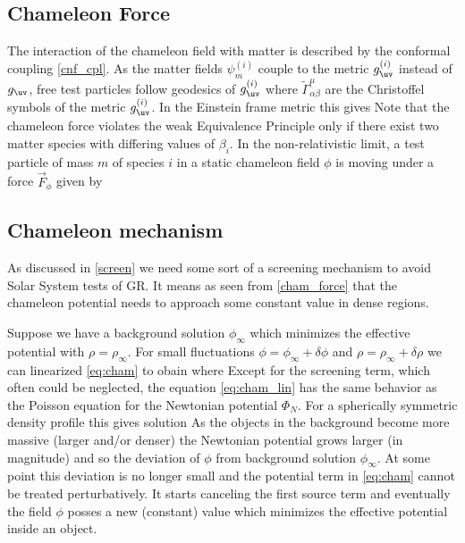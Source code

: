 \subsection{Chameleon Force}
The interaction of the chameleon field with matter is described by the conformal coupling \eqref{cnf_cpl}. As the matter fields $\psi_m^{(i)}$ couple to the metric $g_\uv^{(i)}$ instead of $g_\uv$, free test particles follow geodesics of $g_\uv^{(i)}$
where $\tilde{\Gamma}^\mu_{\alpha\beta}$ are the Christoffel symbols of the metric $g_\uv^{(i)}$. In the Einstein frame metric this gives \parencite{Waterhouse:2006wv}
Note that the chameleon force violates the weak Equivalence Principle only if there exist two matter species with differing values of $\beta_i$. In the non-relativistic limit, a test particle of mass $m$ of species $i$ in a static chameleon field $\phi$ is moving under a force $\vec{F}_\phi$ given by
\subsection{Chameleon mechanism}
As discussed in \autoref{screen} we need some sort of a screening mechanism to avoid Solar System tests of GR. It means as seen from \eqref{cham_force} that the chameleon potential needs to approach some constant value in dense regions.

Suppose we have a background solution $\phi_\infty$ which minimizes the effective potential with $\rho=\rho_\infty$. For small fluctuations $\phi=\phi_\infty+\delta\phi$ and $\rho=\rho_\infty+\delta\rho$ we can linearized \eqref{eq:cham} to obain
where
Except for the screening term, which often could be neglected, the equation \eqref{eq:cham_lin} has the same behavior as the Poisson equation for the Newtonian potential $\Phi_N$. For a spherically symmetric density profile this gives solution
As the objects in the background become more massive (larger and/or denser) the Newtonian potential grows larger (in magnitude) and so the deviation of $\phi$ from background solution $\phi_\infty$. At some point this deviation is no longer small and the potential term in \eqref{eq:cham} cannot be treated perturbatively. It starts canceling the first source term and eventually the field $\phi$ posses a new (constant) value which minimizes the effective potential inside an object.

